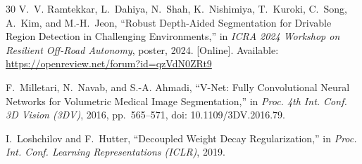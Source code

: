 \begin{thebibliography}{30}
V.~V. Ramtekkar, L.~Dahiya, N.~Shah, K.~Nishimiya, T.~Kuroki,
C.~Song, A.~Kim, and M.-H.~Jeon,
``Robust Depth-Aided Segmentation for Drivable Region Detection in Challenging
Environments,'' in \emph{ICRA 2024 Workshop on Resilient Off-Road Autonomy},
poster, 2024. [Online]. Available:
\url{https://openreview.net/forum?id=qzVdN0ZRt9}

F.~Milletari, N.~Navab, and S.-A. Ahmadi,
``V-Net: Fully Convolutional Neural Networks for Volumetric Medical Image
Segmentation,'' in \emph{Proc. 4th Int. Conf. 3D Vision (3DV)}, 2016,
pp.~565--571, doi: 10.1109/3DV.2016.79.

I.~Loshchilov and F.~Hutter,
``Decoupled Weight Decay Regularization,'' in
\emph{Proc. Int. Conf. Learning Representations (ICLR)}, 2019.

\end{thebibliography}
